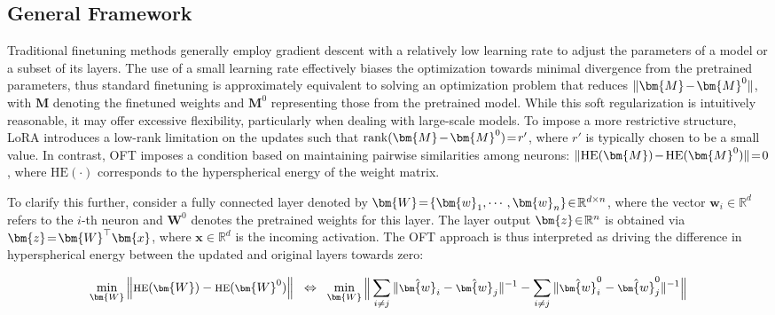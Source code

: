\subsection{General Framework}

Traditional finetuning methods generally employ gradient descent with a relatively low learning rate to adjust the parameters of a model or a subset of its layers. The use of a small learning rate effectively biases the optimization towards minimal divergence from the pretrained parameters, thus standard finetuning is approximately equivalent to solving an optimization problem that reduces $\thickmuskip=2mu \medmuskip=2mu \| \bm{M} - \bm{M}^0\|$, with $\bm{M}$ denoting the finetuned weights and $\bm{M}^0$ representing those from the pretrained model. While this soft regularization is intuitively reasonable, it may offer excessive flexibility, particularly when dealing with large-scale models. To impose a more restrictive structure, LoRA introduces a low-rank limitation on the updates such that $\thickmuskip=2mu \medmuskip=2mu \text{rank}(\bm{M} - \bm{M}^0)=r'$, where $r'$ is typically chosen to be a small value. In contrast, OFT imposes a condition based on maintaining pairwise similarities among neurons: $\thickmuskip=2mu \medmuskip=2mu \| \text{HE}(\bm{M})-\text{HE}(\bm{M}^0) \|=0$, where $\text{HE}(\cdot)$ corresponds to the hyperspherical energy of the weight matrix. 

To clarify this further, consider a fully connected layer denoted by $\thickmuskip=2mu \medmuskip=2mu \bm{W}=\{\bm{w}_1,\cdots,\bm{w}_n\}\in\mathbb{R}^{d\times n}$, where the vector $\bm{w}_i\in\mathbb{R}^{d}$ refers to the $i$-th neuron and $\bm{W}^0$ denotes the pretrained weights for this layer. The layer output $\thickmuskip=2mu \medmuskip=2mu \bm{z}\in\mathbb{R}^n$ is obtained via $\thickmuskip=2mu \medmuskip=2mu \bm{z}=\bm{W}^\top\bm{x}$, where $\bm{x}\in\mathbb{R}^d$ is the incoming activation. The OFT approach is thus interpreted as driving the difference in hyperspherical energy between the updated and original layers towards zero:

\begin{equation}\label{eq:oft_principle}
\footnotesize
\min_{\bm{W}} \left\| \text{HE}(\bm{W})-\text{HE}(\bm{W}^0)\right\|~~\Leftrightarrow~~\min_{\bm{W}} \bigg{\|} \sum_{i\neq j} \|\hat{\bm{w}}_i-\hat{\bm{w}}_j\|^{-1}-\sum_{i\neq j} \|\hat{\bm{w}}^0_i-\hat{\bm{w}}^0_j\|^{-1}\bigg{\|}
\end{equation}

